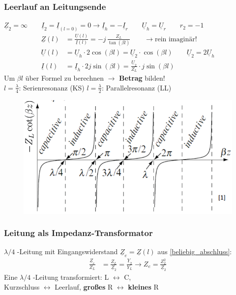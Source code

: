 \subsubsection{Leerlauf an Leitungsende}
$ \underline{Z}_2 = \infty \qquad \underline{I}_2 = \underline{I}_{(l=0)} = 0 \rightarrow \underline{I}_h = - \underline{I}_r \qquad \underline{U}_h = \underline{U}_r  \qquad r_2 = -1$
\begin{align*}
	\underline{Z}(l) & = \frac{\underline{U}(l)}{\underline{I}(l)}  = -j \,\frac{Z_L}{\tan(\beta l)}\qquad\rightarrow \text{rein imaginär!}                 \\
		\underline{U}(l) & = \underline{U}_h \cdot 2 \cos(\beta l) = \underline{U}_2 \cdot \cos(\beta l) \qquad \underline{U}_2 = 2\underline{U}_h\\
	\underline{I}(l)         & = \underline{I}_h\cdot 2j\sin(\beta l) = \frac{\underline{U}_2}{Z_L} \cdot  j \sin(\beta l)
\end{align*}
Um $ \beta l $ über Formel zu berechnen $ \rightarrow $ \textbf{Betrag} bilden!\\

$ l=\frac{\lambda}{4} $: Serienresonanz (KS) \quad $ l=\frac{\lambda}{2} $: Parallelresonanz (LL)

\begin{figure}[H]
	\centering
	\includegraphics[width=0.6\columnwidth]{Figures/Leerlaufende_Leitung.png}
\end{figure}

\subsubsection{Leitung als Impedanz-Transformator}
$\lambda / 4$ -Leitung mit Eingangswiderstand $ \underline{Z}_e = \underline{Z}(l) $ aus  \ref{beliebig_abschluss}:
\begin{align*}
	\frac{\underline{Z}_e}{Z_L} & = \frac{Z_L}{\underline{Z}_2} = \frac{\underline{Y}_2}{Y_L} \rightarrow Z_e = \frac{Z^2_L}{\underline{Z}_2}
\end{align*}
Eine $ \lambda / 4 $ -Leitung transformiert:
L $ \leftrightarrow $ C, \\Kurzschluss $ \leftrightarrow $ Leerlauf, \textbf{großes} R $ \leftrightarrow$ \textbf{kleines} R

